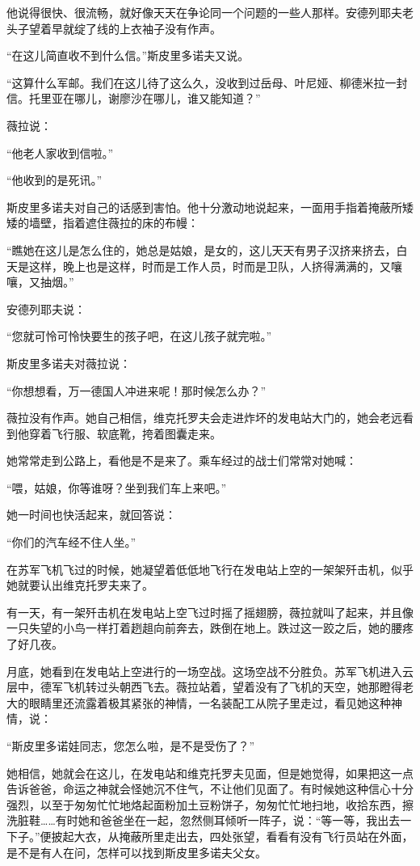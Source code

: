 他说得很快、很流畅，就好像天天在争论同一个问题的一些人那样。安德列耶夫老头子望着早就绽了线的上衣袖子没有作声。

“在这儿简直收不到什么信。”斯皮里多诺夫又说。

“这算什么军邮。我们在这儿待了这么久，没收到过岳母、叶尼娅、柳德米拉一封信。托里亚在哪儿，谢廖沙在哪儿，谁又能知道？”

薇拉说：

“他老人家收到信啦。”

“他收到的是死讯。”

斯皮里多诺夫对自己的话感到害怕。他十分激动地说起来，一面用手指着掩蔽所矮矮的墙壁，指着遮住薇拉的床的布幔：

“瞧她在这儿是怎么住的，她总是姑娘，是女的，这儿天天有男子汉挤来挤去，白天是这样，晚上也是这样，时而是工作人员，时而是卫队，人挤得满满的，又嚷嚷，又抽烟。”

安德列耶夫说：

“您就可怜可怜快要生的孩子吧，在这儿孩子就完啦。”

斯皮里多诺夫对薇拉说：

“你想想看，万一德国人冲进来呢！那时候怎么办？”

薇拉没有作声。她自己相信，维克托罗夫会走进炸坏的发电站大门的，她会老远看到他穿着飞行服、软底靴，挎着图囊走来。

她常常走到公路上，看他是不是来了。乘车经过的战士们常常对她喊：

“喂，姑娘，你等谁呀？坐到我们车上来吧。”

她一时间也快活起来，就回答说：

“你们的汽车经不住人坐。”

在苏军飞机飞过的时候，她凝望着低低地飞行在发电站上空的一架架歼击机，似乎她就要认出维克托罗夫来了。

有一天，有一架歼击机在发电站上空飞过时摇了摇翅膀，薇拉就叫了起来，并且像一只失望的小鸟一样打着趔趄向前奔去，跌倒在地上。跌过这一跤之后，她的腰疼了好几夜。

月底，她看到在发电站上空进行的一场空战。这场空战不分胜负。苏军飞机进入云层中，德军飞机转过头朝西飞去。薇拉站着，望着没有了飞机的天空，她那瞪得老大的眼睛里还流露着极其紧张的神情，一名装配工从院子里走过，看见她这种神情，说：

“斯皮里多诺娃同志，您怎么啦，是不是受伤了？”

她相信，她就会在这儿，在发电站和维克托罗夫见面，但是她觉得，如果把这一点告诉爸爸，命运之神就会怪她沉不住气，不让他们见面了。有时候她这种信心十分强烈，以至于匆匆忙忙地烙起面粉加土豆粉饼子，匆匆忙忙地扫地，收拾东西，擦洗脏鞋……有时她和爸爸坐在一起，忽然侧耳倾听一阵子，说：“等一等，我出去一下子。”便披起大衣，从掩蔽所里走出去，四处张望，看看有没有飞行员站在外面，是不是有人在问，怎样可以找到斯皮里多诺夫父女。

